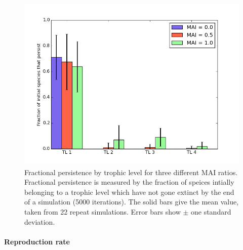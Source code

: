 \begin{figure}
	\centering
	\includegraphics[width=0.8\linewidth]{"figures/hist_species_per_tl_zeroIR"}
	\caption{Fractional persistence by trophic level for three different MAI ratios. Fractional persistence is measured by the fraction of speices intially belonging to a trophic level which have not gone extinct by the end of a simulation (5000 iterations). The solid bars give the mean value, taken  from 22 repeat simulations. Error bars show $\pm$ one standard deviation.}
	\label{fig:mvp_hist_zeroIR}
\end{figure}

\paragraph*{Reproduction rate}



